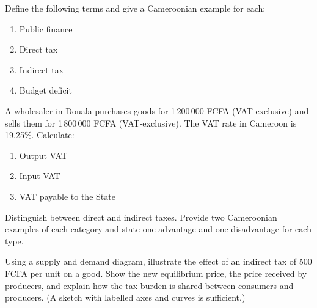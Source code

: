 \documentclass[11pt]{article}
\newcounter{popsec}
\newcounter{popsub}
\newcommand{\courssub}[1]{%
  \stepcounter{popsub}%
  \par\vspace{9pt}\noindent{\popxbold\fontsize{11.5}{13}\selectfont\color{popink}{\color{poporange}\thepopsec.\thepopsub}\hspace{6pt}#1}\par\nopagebreak\vspace{4pt}
}
\begin{document}
\begin{exercice}[Definitions]
Define the following terms and give a Cameroonian example for each:
\begin{enumerate}
\item Public finance
\item Direct tax
\item Indirect tax
\item Budget deficit
\end{enumerate}
\end{exercice}

\begin{exercice}
A wholesaler in Douala purchases goods for 1\,200\,000 FCFA (VAT‑exclusive) and sells them for 1\,800\,000 FCFA (VAT‑exclusive). The VAT rate in Cameroon is 19.25\%. Calculate:
\begin{enumerate}
\item Output VAT
\item Input VAT
\item VAT payable to the State
\end{enumerate}
\end{exercice}

\courssub{I practise}

\begin{exercice}
Distinguish between direct and indirect taxes. Provide two Cameroonian examples of each category and state one advantage and one disadvantage for each type.
\end{exercice}

\begin{exercice}
Using a supply and demand diagram, illustrate the effect of an indirect tax of 500 FCFA per unit on a good. Show the new equilibrium price, the price received by producers, and explain how the tax burden is shared between consumers and producers. (A sketch with labelled axes and curves is sufficient.)
\end{exercice}
\end{document}
